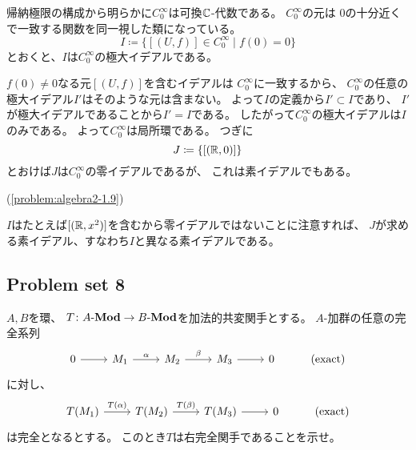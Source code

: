 \documentclass[report]{jlreq}
\begin{document}
\begin{answer}
    帰納極限の構成から明らかに$C_0^\infty$は可換$\mathbb{C}$-代数である。
    $C_0^\infty$の元は
    $0$の十分近くで一致する関数を同一視した類になっている。
    \begin{equation}
        I \coloneqq \{
            [(U, f)] \in C_0^\infty
            \mid
            f(0) = 0
        \}
    \end{equation}
    とおくと、$I$は$C_0^\infty$の極大イデアルである。
    \begin{innerproof}
        \TODO{}
    \end{innerproof}
    $f(0) \neq 0$なる元$[(U, f)]$を含むイデアルは
    $C_0^\infty$に一致するから、
    $C_0^\infty$の任意の極大イデアル$I'$はそのような元は含まない。
    よって$I$の定義から$I' \subset I$であり、
    $I'$が極大イデアルであることから$I' = I$である。
    したがって$C_0^\infty$の極大イデアルは$I$のみである。
    よって$C_0^\infty$は局所環である。
    つぎに
    \begin{equation}
        J \coloneqq \{ [(\mathbb{R}, 0)] \}
    \end{equation}
    とおけば$J$は$C_0^\infty$の零イデアルであるが、
    これは素イデアルでもある。
    \begin{innerproof}
        \TODO{}
        (\cref{problem:algebra2-1.9})
    \end{innerproof}
    $I$はたとえば$[(\mathbb{R}, x^2)]$を含むから零イデアルではないことに注意すれば、
    $J$が求める素イデアル、すなわち$I$と異なる素イデアルである。
\end{answer}

\subsection{Problem set 8}

\begin{problem}[代数学II 8.108]
    $A, B$を環、
    $T \colon A\text{-}\mathbf{Mod} \to B\text{-}\mathbf{Mod}$を加法的共変関手とする。
    $A$-加群の任意の完全系列
    \begin{equation}
        \begin{tikzcd}
            0 \ar{r}
                & M_1 \ar{r}{\alpha}
                & M_2 \ar{r}{\beta}
                & M_3 \ar{r}
                & 0
                & (\text{exact})
        \end{tikzcd}
    \end{equation}
    に対し、
    \begin{equation}
        \begin{tikzcd}
            T(M_1) \ar{r}{T(\alpha)}
                & T(M_2) \ar{r}{T(\beta)}
                & T(M_3) \ar{r}
                & 0
                & (\text{exact})
        \end{tikzcd}
    \end{equation}
    は完全となるとする。
    このとき$T$は右完全関手であることを示せ。
\end{problem}
\end{document}
